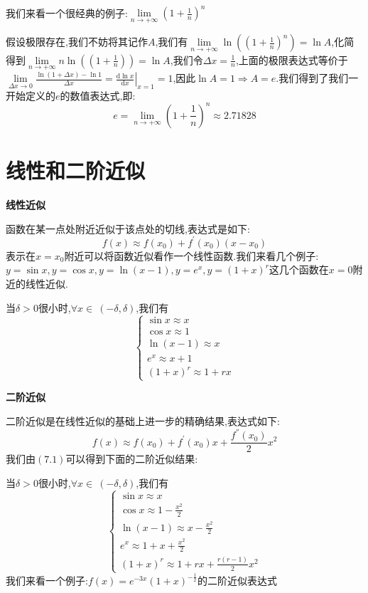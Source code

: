 \documentclass[oneside]{book}
\begin{document}
	\hspace{\fill}\
	
	我们来看一个很经典的例子:$\lim\limits_{n\rightarrow +\infty}(1+\frac{1}{n})^{n}$
	
	假设极限存在,我们不妨将其记作$A$,我们有$\lim\limits_{n\rightarrow +\infty}\ln((1+\frac{1}{n})^{n})=\ln A$,化简得到$\lim\limits_{n\rightarrow +\infty}n\ln((1+\frac{1}{n}))=\ln A$,我们令$\Delta x=\frac{1}{n}$,上面的极限表达式等价于$\lim\limits_{\Delta x\rightarrow 0}\frac{\ln(1+\Delta x)-\ln 1}{\Delta x}=\left.\frac{\mathrm{d}\ln x}{\mathrm{d}x}\right|_{x=1}=1$,因此$\ln A=1\Rightarrow A=e$.我们得到了我们一开始定义的$e$的数值表达式,即:$$e=\lim\limits_{n\rightarrow +\infty}(1+\frac{1}{n})^{n}\approx 2.71828$$
	\chapter{线性和二阶近似}
	\centerline{\textbf{线性近似}}
	函数在某一点处附近近似于该点处的切线,表达式是如下:
	$$f(x)\approx f(x_{0})+f^{'}(x_{0})(x-x_{0})$$
	表示在$x=x_{0}$附近可以将函数近似看作一个线性函数.我们来看几个例子:$y=\sin x,y=\cos x,y=\ln (x-1),y=e^{x},y=(1+x)^{r}$这几个函数在$x=0$附近的线性近似.
	
	当$\delta>0$很小时,$\forall x\in\ (-\delta,\delta)$,我们有\begin{equation}\left\{\begin{array}{c}
		\sin x\approx x\\\cos x\approx 1\\\ln(x-1)\approx x\\e^{x}\approx x+1\\(1+x)^{r}\approx 1+rx
	\end{array}\right.\end{equation}
	
	\centerline{\textbf{二阶近似}}
	
	二阶近似是在线性近似的基础上进一步的精确结果,表达式如下:
	$$f(x)\approx f(x_{0})+f^{'}(x_{0})x+\frac{f^{''}(x_{0})}{2}x^{2}$$
	我们由$(7.1)$可以得到下面的二阶近似结果:
	
	当$\delta>0$很小时,$\forall x\in\ (-\delta,\delta)$,我们有
	\begin{equation}\left\{\begin{array}{c}
			\sin x\approx x\\\cos x\approx 1-\frac{x^{2}}{2}\\\ln(x-1)\approx x-\frac{x^{2}}{2}\\e^{x}\approx 1+x+\frac{x^{2}}{2}\\(1+x)^{r}\approx 1+rx+\frac{r(r-1)}{2}x^{2}
		\end{array}\right.\end{equation}
	我们来看一个例子:$f(x)=e^{-3x}(1+x)^{-\frac{1}{2}}$的二阶近似表达式
	
\end{document}
